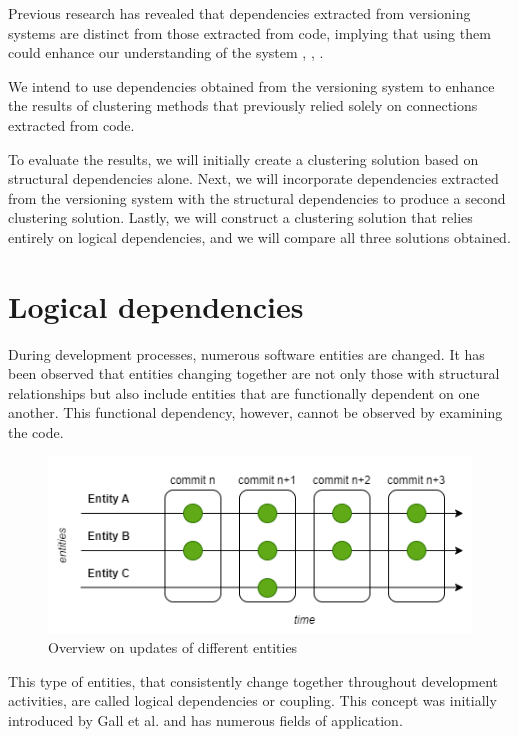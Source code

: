 \documentclass[conference]{IEEEtran}
\begin{document}
Previous research has revealed that dependencies extracted from versioning systems are distinct from those extracted from code, implying that using them could enhance our understanding of the system \cite{DBLP:conf/issre/OlivaG15}, \cite{DBLP:journals/jss/AjienkaC17}, \cite{Oliva:2011:ISL:2067853.2068086}.

We intend to use dependencies obtained from the versioning system to enhance the results of clustering methods that previously relied solely on connections extracted from code. 

To evaluate the results, we will initially create a clustering solution based on structural dependencies alone. Next, we will incorporate dependencies extracted from the versioning system with the structural dependencies to produce a second clustering solution. Lastly, we will construct a clustering solution that relies entirely on logical dependencies, and we will compare all three solutions obtained.


\section{Logical dependencies}
\label{ld_def}

During development processes, numerous software entities are changed. It has been observed that entities changing together are not only those with structural relationships but also include entities that are functionally dependent on one another. This functional dependency, however, cannot be observed by examining the code.

\begin{figure}
\centering
\includegraphics[scale=0.6]{dependencies.png}
\caption{Overview on updates of different entities}
\label{fig:dependencies}
\centering
\end{figure}

This type of entities, that consistently change together throughout development activities, are called logical dependencies or coupling. This concept was initially introduced by Gall et al. \cite{Gall:1998:DLC:850947.853338} and has numerous fields of application.
\end{document}

